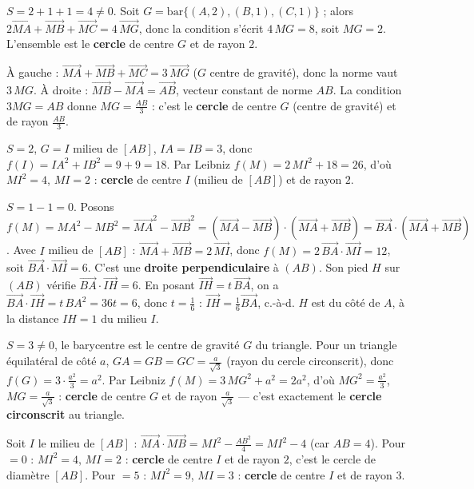 $S=2+1+1=4\neq0$. Soit $G=\mathrm{bar}\{(A,2),(B,1),(C,1)\}$ ; alors $2\overrightarrow{MA}+\overrightarrow{MB}+\overrightarrow{MC}=4\,\overrightarrow{MG}$, donc la condition s'écrit $4\,MG=8$, soit $MG=2$. L'ensemble est le \textbf{cercle} de centre $G$ et de rayon $2$.

À gauche : $\overrightarrow{MA}+\overrightarrow{MB}+\overrightarrow{MC}=3\,\overrightarrow{MG}$ ($G$ centre de gravité), donc la norme vaut $3\,MG$. À droite : $\overrightarrow{MB}-\overrightarrow{MA}=\overrightarrow{AB}$, vecteur constant de norme $AB$. La condition $3MG=AB$ donne $MG=\frac{AB}{3}$ : c'est le \textbf{cercle} de centre $G$ (centre de gravité) et de rayon $\frac{AB}{3}$.

$S=2$, $G=I$ milieu de $[AB]$, $IA=IB=3$, donc $f(I)=IA^{2}+IB^{2}=9+9=18$. Par Leibniz $f(M)=2\,MI^{2}+18=26$, d'où $MI^{2}=4$, $MI=2$ : \textbf{cercle} de centre $I$ (milieu de $[AB]$) et de rayon $2$.

$S=1-1=0$. Posons $f(M)=MA^{2}-MB^{2}=\overrightarrow{MA}^{2}-\overrightarrow{MB}^{2}=(\overrightarrow{MA}-\overrightarrow{MB})\cdot(\overrightarrow{MA}+\overrightarrow{MB})=\overrightarrow{BA}\cdot(\overrightarrow{MA}+\overrightarrow{MB})$.
Avec $I$ milieu de $[AB]$ : $\overrightarrow{MA}+\overrightarrow{MB}=2\,\overrightarrow{MI}$, donc $f(M)=2\,\overrightarrow{BA}\cdot\overrightarrow{MI}=12$, soit $\overrightarrow{BA}\cdot\overrightarrow{MI}=6$. C'est une \textbf{droite perpendiculaire} à $(AB)$. Son pied $H$ sur $(AB)$ vérifie $\overrightarrow{BA}\cdot\overrightarrow{IH}=6$. En posant $\overrightarrow{IH}=t\,\overrightarrow{BA}$, on a $\overrightarrow{BA}\cdot\overrightarrow{IH}=t\,BA^2=36t=6$, donc $t=\frac16$ : $\overrightarrow{IH}=\frac16\overrightarrow{BA}$, c.-à-d. $H$ est du côté de $A$, à la distance $IH=1$ du milieu $I$.

$S=3\neq0$, le barycentre est le centre de gravité $G$ du triangle. Pour un triangle équilatéral de côté $a$, $GA=GB=GC=\frac{a}{\sqrt3}$ (rayon du cercle circonscrit), donc $f(G)=3\cdot\frac{a^{2}}{3}=a^{2}$. Par Leibniz $f(M)=3\,MG^{2}+a^{2}=2a^{2}$, d'où $MG^{2}=\frac{a^{2}}{3}$, $MG=\frac{a}{\sqrt3}$ : \textbf{cercle} de centre $G$ et de rayon $\frac{a}{\sqrt3}$ — c'est exactement le \textbf{cercle circonscrit} au triangle.

Soit $I$ le milieu de $[AB]$ : $\overrightarrow{MA}\cdot\overrightarrow{MB}=MI^2-\frac{AB^2}{4}=MI^2-4$ (car $AB=4$).
Pour $=0$ : $MI^2=4$, $MI=2$ : \textbf{cercle} de centre $I$ et de rayon $2$, c'est le cercle de diamètre $[AB]$.
Pour $=5$ : $MI^2=9$, $MI=3$ : \textbf{cercle} de centre $I$ et de rayon $3$.

